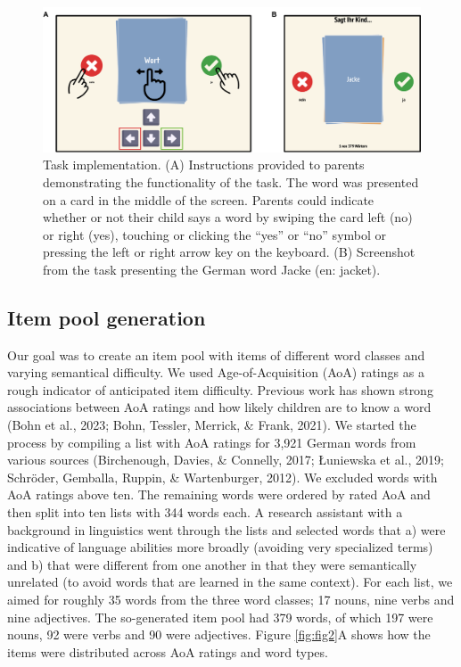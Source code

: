 \documentclass[
  man,floatsintext]{apa6}
\begin{document}
\begin{figure}

{\centering \includegraphics[width=1\linewidth]{../graphs/fig1} 

}

\caption{Task implementation. (A) Instructions provided to parents demonstrating the functionality of the task. The word was presented on a card in the middle of the screen. Parents could indicate whether or not their child says a word by swiping the card left (no) or right (yes), touching or clicking the ``yes'' or ``no'' symbol or pressing the left or right arrow key on the keyboard. (B) Screenshot from the task presenting the German word Jacke (en: jacket).}\label{fig:fig1}
\end{figure}

\hypertarget{item-pool-generation}{%
\subsection{Item pool generation}\label{item-pool-generation}}

Our goal was to create an item pool with items of different word classes and varying semantical difficulty. We used Age-of-Acquisition (AoA) ratings as a rough indicator of anticipated item difficulty. Previous work has shown strong associations between AoA ratings and how likely children are to know a word (Bohn et al., 2023; Bohn, Tessler, Merrick, \& Frank, 2021). We started the process by compiling a list with AoA ratings for 3,921 German words from various sources (Birchenough, Davies, \& Connelly, 2017; Łuniewska et al., 2019; Schröder, Gemballa, Ruppin, \& Wartenburger, 2012). We excluded words with AoA ratings above ten. The remaining words were ordered by rated AoA and then split into ten lists with 344 words each. A research assistant with a background in linguistics went through the lists and selected words that a) were indicative of language abilities more broadly (avoiding very specialized terms) and b) that were different from one another in that they were semantically unrelated (to avoid words that are learned in the same context). For each list, we aimed for roughly 35 words from the three word classes; 17 nouns, nine verbs and nine adjectives. The so-generated item pool had 379 words, of which 197 were nouns, 92 were verbs and 90 were adjectives. Figure \ref{fig:fig2}A shows how the items were distributed across AoA ratings and word types.
\end{document}
